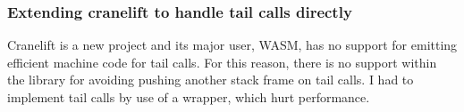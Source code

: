 \subsubsection{Extending cranelift to handle tail calls directly}

Cranelift is a new project and its major user, WASM, has no support for emitting efficient machine
code for tail calls.  For this reason, there is no support within the library for avoiding pushing
another stack frame on tail calls. I had to implement tail calls by use of a wrapper, which hurt
performance.